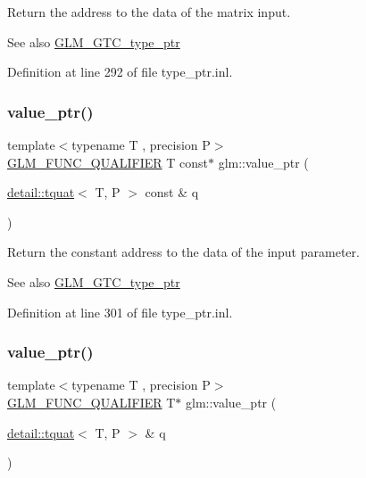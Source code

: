 Return the address to the data of the matrix input. \begin{DoxySeeAlso}{See also}
\hyperlink{group__gtc__type__ptr}{G\+L\+M\+\_\+\+G\+T\+C\+\_\+type\+\_\+ptr} 
\end{DoxySeeAlso}


Definition at line 292 of file type\+\_\+ptr.\+inl.

\mbox{\label{group__gtc__type__ptr_ga961a5b150a0ffd632aaa0252c4d6b9ab}} 
\subsubsection{\texorpdfstring{value\+\_\+ptr()}{value\_ptr()}\hspace{0.1cm}{\footnotesize\ttfamily [26/27]}}
{\footnotesize\ttfamily template$<$typename T , precision P$>$ \\
\hyperlink{setup_8hpp_a33fdea6f91c5f834105f7415e2a64407}{G\+L\+M\+\_\+\+F\+U\+N\+C\+\_\+\+Q\+U\+A\+L\+I\+F\+I\+ER} T const$\ast$ glm\+::value\+\_\+ptr (\begin{DoxyParamCaption}\item[{\hyperlink{structglm_1_1detail_1_1tquat}{detail\+::tquat}$<$ T, P $>$ const \&}]{q }\end{DoxyParamCaption})}

Return the constant address to the data of the input parameter. \begin{DoxySeeAlso}{See also}
\hyperlink{group__gtc__type__ptr}{G\+L\+M\+\_\+\+G\+T\+C\+\_\+type\+\_\+ptr} 
\end{DoxySeeAlso}


Definition at line 301 of file type\+\_\+ptr.\+inl.

\mbox{\label{group__gtc__type__ptr_gab72389186ae9e8c822ff6cc9b474a37f}} 
\subsubsection{\texorpdfstring{value\+\_\+ptr()}{value\_ptr()}\hspace{0.1cm}{\footnotesize\ttfamily [27/27]}}
{\footnotesize\ttfamily template$<$typename T , precision P$>$ \\
\hyperlink{setup_8hpp_a33fdea6f91c5f834105f7415e2a64407}{G\+L\+M\+\_\+\+F\+U\+N\+C\+\_\+\+Q\+U\+A\+L\+I\+F\+I\+ER} T$\ast$ glm\+::value\+\_\+ptr (\begin{DoxyParamCaption}\item[{\hyperlink{structglm_1_1detail_1_1tquat}{detail\+::tquat}$<$ T, P $>$ \&}]{q }\end{DoxyParamCaption})}

